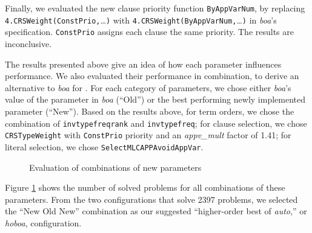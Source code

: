 \begin{sloppypar}
Finally, we evaluated the new clause priority function \texttt{ByAppVarNum}, by replacing
\verb|4.CRSWeight(ConstPrio,|\allowbreak\ldots\verb|)| with \verb|4.CRSWeight(ByAppVarNum,|\ldots\verb|)| in
\emph{boa}'s specification. \texttt{ConstPrio} assigns each clause the
same priority. The results are inconclusive.
\end{sloppypar}

The results presented above give an idea of how each parameter influences
performance. We also evaluated their performance in combination, to derive an
alternative to \emph{boa} for \lfhol{}.
%
For each category of parameters, we chose either \emph{boa}'s value of the
parameter in \emph{boa} (``Old'') or the best performing newly implemented
parameter (``New'').
Based on the results above, for term orders, we chose the combination of
\texttt{invtypefreqrank} and \texttt{invtypefreq}; for clause selection, we
chose \texttt{CRSType}\-\texttt{Weight} with \texttt{ConstPrio} priority and
an \emph{appv\_mult} factor of 1.41; for literal selection, we chose
\texttt{SelectMLC}\-\texttt{APP}\-\texttt{AvoidAppVar}.

\begin{figure}[t]
  \center
  \caption{Evaluation of combinations of new parameters}
  \label{fig:ehoh:new-modes}
\end{figure}

Figure \ref{fig:ehoh:new-modes} shows the number of solved problems for all
combinations of these parameters. From the two configurations that solve 2397
problems, we selected the ``New Old New'' combination as our suggested
``higher-order best of \emph{auto},'' or \emph{hoboa}, configuration.

